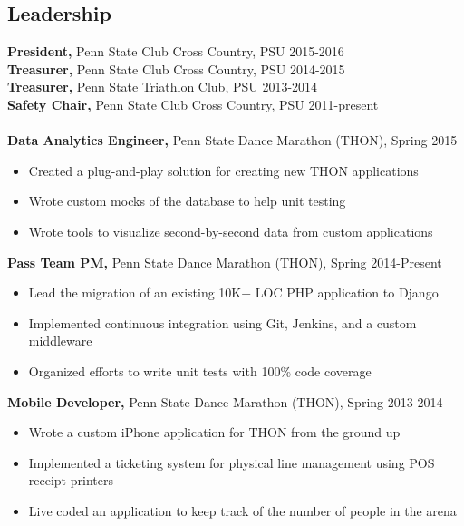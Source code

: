 \documentclass[margin]{res}
\begin{document}
\begin{resume}
\section{Leadership}
{\bf President,} Penn State Club Cross Country, PSU \hfill 2015-2016 \\
{\bf Treasurer,} Penn State Club Cross Country, PSU \hfill 2014-2015 \\
{\bf Treasurer,} Penn State Triathlon Club, PSU \hfill 2013-2014 \\
{\bf Safety Chair,} Penn State Club Cross Country, PSU \hfill 2011-present \\ \\
{\bf Data Analytics Engineer,} Penn State Dance Marathon (THON), \hfill Spring 2015
\begin{itemize} \itemsep -2pt %
\item Created a plug-and-play solution for creating new THON applications
\item Wrote custom mocks of the database to help unit testing
\item Wrote tools to visualize second-by-second data from custom applications
\end{itemize}
{\bf Pass Team PM,} Penn State Dance Marathon (THON), \hfill Spring 2014-Present
\begin{itemize} \itemsep -2pt %
\item Lead the migration of an existing 10K+ LOC PHP application to Django
\item Implemented continuous integration using Git, Jenkins, and a custom middleware
\item Organized efforts to write unit tests with 100\% code coverage
\end{itemize}
{\bf Mobile Developer,} Penn State Dance Marathon (THON), \hfill Spring 2013-2014
\begin{itemize} \itemsep -2pt %
\item Wrote a custom iPhone application for THON from the ground up
\item Implemented a ticketing system for physical line management using POS receipt printers
\item Live coded an application to keep track of the number of people in the arena
\end{itemize}


\end{resume}
\end{document}
